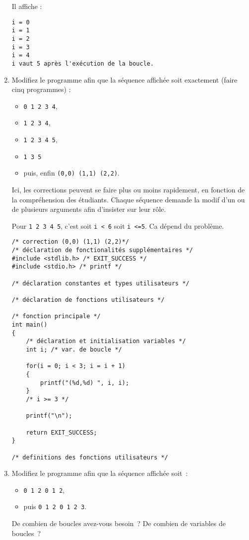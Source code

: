 \begin{enumerate}
\begin{correction}
Il affiche :
\begin{verbatim}
i = 0
i = 1
i = 2
i = 3
i = 4
i vaut 5 après l'exécution de la boucle.
\end{verbatim}
\end{correction}
\item Modifiez le programme afin que la séquence affichée soit
  exactement (faire cinq programmes) :
  \begin{itemize}
  \item \verb|0 1 2 3 4|,
  \item \verb|1 2 3 4|,
  \item \verb|1 2 3 4 5|,
  \item \verb|1 3 5|
  \item puis, enfin \verb|(0,0) (1,1) (2,2)|.
  \end{itemize}
  \begin{correction}
    Ici, les corrections peuvent se faire plus ou moins rapidement, en
    fonction de la compréhension des étudiants. Chaque séquence
    demande la modif d'un ou de plusieurs arguments afin d'insister
    sur leur rôle. 

Pour \verb|1 2 3 4 5|, c'est soit \verb|i < 6| soit \verb|i <=5|. Ca dépend du problème.
\begin{verbatim}
/* correction (0,0) (1,1) (2,2)*/
/* déclaration de fonctionalités supplémentaires */
#include <stdlib.h> /* EXIT_SUCCESS */
#include <stdio.h> /* printf */

/* déclaration constantes et types utilisateurs */

/* déclaration de fonctions utilisateurs */

/* fonction principale */
int main()
{
    /* déclaration et initialisation variables */
    int i; /* var. de boucle */

    for(i = 0; i < 3; i = i + 1)
    {
        printf("(%d,%d) ", i, i);
    }
    /* i >= 3 */

    printf("\n");

    return EXIT_SUCCESS;
}

/* definitions des fonctions utilisateurs */
\end{verbatim}

  \end{correction}
\item Modifiez le programme afin que la séquence affichée soit~:
  \begin{itemize}
  \item \verb|0 1 2 0 1 2|,
  \item puis \verb|0 1 2 0 1 2 3|.
  \end{itemize}
  De combien de boucles avez-vous besoin~? De combien de variables de
  boucles~?


\end{enumerate}
